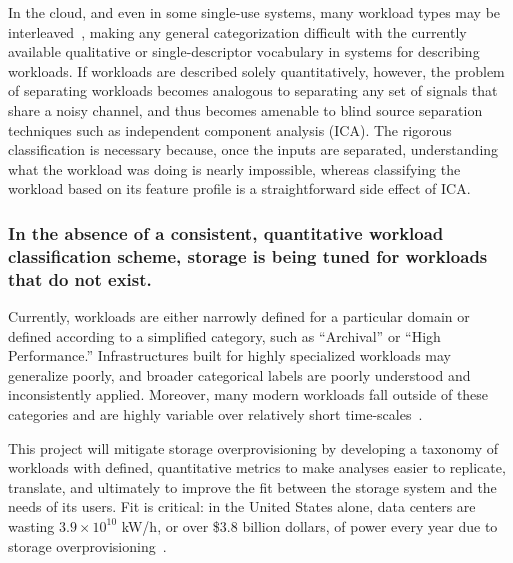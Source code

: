 In the cloud, and even in some single-use systems, many workload types may be
interleaved~\cite{TK}, making any general categorization difficult with the
currently available qualitative or single-descriptor vocabulary in systems for
describing workloads. If workloads are described solely quantitatively, however,
the problem of separating workloads becomes analogous to separating any set of
signals that share a noisy channel, and thus becomes amenable to blind source
separation techniques such as independent component analysis (ICA). The rigorous
classification is necessary because, once the inputs are separated,
understanding what the workload was doing is nearly impossible, whereas
classifying the workload based on its feature profile is a straightforward side
effect of ICA.

\subsubsection*{In the absence of a consistent, quantitative workload classification scheme, storage is being tuned for workloads that do not exist.}

Currently, workloads are either narrowly defined for a particular domain or
defined according to a simplified category, such as ``Archival'' or ``High
Performance.'' Infrastructures built for highly specialized workloads may
generalize poorly, and broader categorical labels are poorly understood and
inconsistently applied.  Moreover, many modern workloads fall outside of these
categories and are highly variable over relatively short
time-scales~\cite{google_dist_store_2015}.


This project will mitigate storage overprovisioning by developing a
taxonomy of workloads with defined, quantitative metrics to make analyses
easier to replicate, translate, and ultimately to improve the fit between the
storage system and the needs of its users. Fit is critical: in the United States alone, data centers are wasting
$3.9\times10^{10}$ kW/h, or over \$3.8 billion dollars, of power every year due
to storage overprovisioning~\cite{nrdc}.

%




